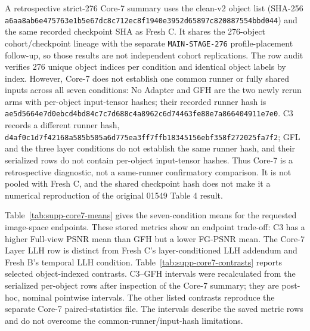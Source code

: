 \documentclass[11pt]{article}
\begin{document}
A retrospective strict-276 Core-7 summary uses the clean-v2 object list (SHA-256 \texttt{a6aa8ab6\allowbreak{}e475763e\allowbreak{}1b5e67dc\allowbreak{}8c712ec8\allowbreak{}f1940e39\allowbreak{}52d65897\allowbreak{}c8208875\allowbreak{}54bbd044}) and the same recorded checkpoint SHA as Fresh C. It shares the 276-object cohort/checkpoint lineage with the separate \texttt{MAIN-STAGE-276} profile-placement follow-up, so those results are not independent cohort replications. The row audit verifies 276 unique object indices per condition and identical object labels by index. However, Core-7 does not establish one common runner or fully shared inputs across all seven conditions: No Adapter and GFH are the two newly rerun arms with per-object input-tensor hashes; their recorded runner hash is \texttt{ae5d5664\allowbreak{}e7d0ebcd\allowbreak{}4bd84c7c\allowbreak{}7d688c4a\allowbreak{}8962c6d7\allowbreak{}4463fe88\allowbreak{}e7a86640\allowbreak{}4911e7e0}. C3 records a different runner hash, \texttt{d4af0c1d\allowbreak{}7f42168a\allowbreak{}585b505a\allowbreak{}6d775ea3\allowbreak{}ff7ffb18\allowbreak{}345156eb\allowbreak{}f358f272\allowbreak{}025fa7f2}; GFL and the three layer conditions do not establish the same runner hash, and their serialized rows do not contain per-object input-tensor hashes. Thus Core-7 is a retrospective diagnostic, not a same-runner confirmatory comparison. It is not pooled with Fresh C, and the shared checkpoint hash does not make it a numerical reproduction of the original 01549 Table 4 result.

Table~\ref{tab:supp-core7-means} gives the seven-condition means for the requested image-space endpoints. These stored metrics show an endpoint trade-off: C3 has a higher Full-view PSNR mean than GFH but a lower FG-PSNR mean. The Core-7 Layer LLH row is distinct from Fresh C's layer-conditioned LLH addendum and Fresh B's temporal LLH condition. Table~\ref{tab:supp-core7-contrasts} reports selected object-indexed contrasts. C3--GFH intervals were recalculated from the serialized per-object rows after inspection of the Core-7 summary; they are post-hoc, nominal pointwise intervals. The other listed contrasts reproduce the separate Core-7 paired-statistics file. The intervals describe the saved metric rows and do not overcome the common-runner/input-hash limitations.
\end{document}
